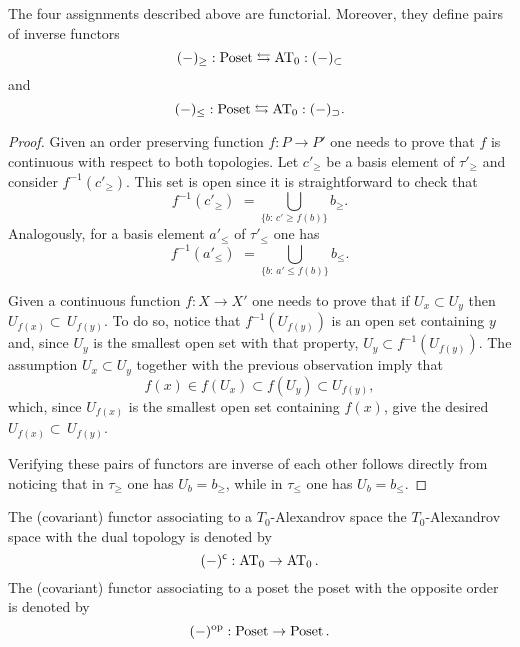 \documentclass[main.tex]{subfiles}
\begin{document}
\begin{lemma}\label{from posets to A spaces and back}
The four assignments described above are functorial. Moreover, they define pairs of inverse functors
$$(-)_{\geq}:\Poset\leftrightarrows\AT_0:(-)_\subset$$
and
$$(-)_{\leq}:\Poset\leftrightarrows\AT_0:(-)_\supset.$$
\begin{proof}
Given an order preserving function $f:P\to P'$ one needs to prove that $f$ is continuous with respect to both topologies. Let $c'_\geq$ be a basis element of $\tau'_\geq$ and consider $f^{-1}(c'_\geq)$. This set is open since it is straightforward to check that
$$f^{-1}(c'_\geq)\,\,=\!\!\!\bigcup_{\{b:\,c'\geq f(b)\!\}}\!\!b_\geq.$$
Analogously, for a basis element $a'_\leq$ of $\tau'_\leq$ one has
$$f^{-1}(a'_\leq)\,\,=\!\!\!\bigcup_{\{b:\,a'\leq f(b)\!\}}\!\!b_\leq.$$

Given a continuous function $f:X\to X'$ one needs to prove that if $U_x\subset U_y$ then $U_{f(x)}\subset\, U_{f(y)}$. To do so, notice that $f^{-1}(U_{f(y)})$ is an open set containing $y$ and, since $U_y$ is the smallest open set with that property, $U_y\subset f^{-1}(U_{f(y)})$. The assumption $U_x\subset U_y$ together with the previous observation imply that
$$f(x)\in f(U_x)\subset f(U_y)\subset U_{f(y)},$$
which, since $U_{f(x)}$ is the smallest open set containing $f(x)$, give the desired $U_{f(x)}\subset\, U_{f(y)}$.

Verifying these pairs of functors are inverse of each other follows directly from noticing that in $\tau_\geq$ one has $U_b=b_\geq$, while in $\tau_\leq$ one has $U_b=b_\leq$.
\end{proof}
\end{lemma}

\begin{defn}
The (covariant) functor associating to a $T_0$-Alexandrov space the $T_0$-Alexandrov space with the dual topology is denoted by
$$(-)^\c:\AT_0\to\AT_0.$$
The (covariant) functor associating to a poset the poset with the opposite order is denoted by
$$(-)^{\operatorname{op}}:\operatorname{Poset}\to\operatorname{Poset}.$$
\end{defn}
\end{document}
